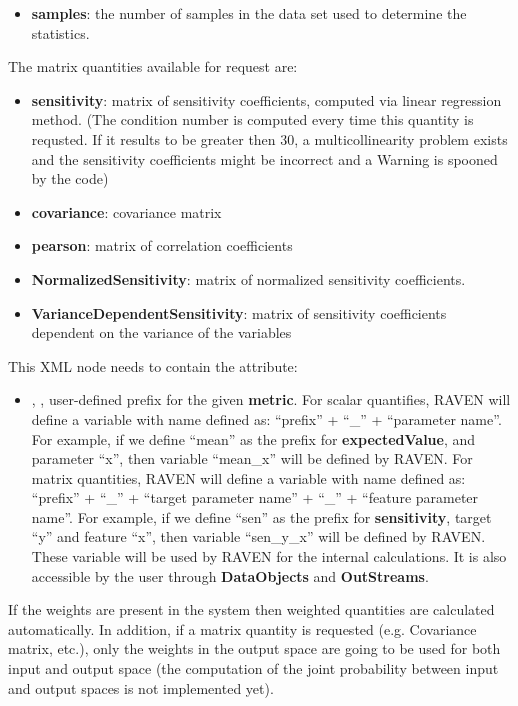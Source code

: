 \begin{itemize}
\begin{itemize}
    \item \textbf{samples}: the number of samples in the data set used to determine the statistics.
  \end{itemize}
  The matrix quantities available for request are:
  \begin{itemize}
    \item \textbf{sensitivity}: matrix of sensitivity coefficients, computed via linear regression method. (\nb The condition number is computed every time this quantity is requsted. If it results
    to be greater then $30$, a multicollinearity problem exists and the sensitivity coefficients
    might be incorrect and a Warning is spooned by the code)
    \item \textbf{covariance}: covariance matrix
    \item \textbf{pearson}: matrix of correlation coefficients
    \item \textbf{NormalizedSensitivity}: matrix of normalized sensitivity
    coefficients. 
    \item \textbf{VarianceDependentSensitivity}: matrix of sensitivity coefficients dependent on the variance of the variables
  \end{itemize}
  This XML node needs to contain the attribute:
  \begin{itemize}
    \itemsep0em
    \item {}, , user-defined prefix for the given \textbf{metric}.
      For scalar quantifies, RAVEN will define a variable with name defined as:  ``prefix'' + ``\_'' + ``parameter name''.
      For example, if we define ``mean'' as the prefix for \textbf{expectedValue}, and parameter ``x'', then variable
      ``mean\_x'' will be defined by RAVEN.
      For matrix quantities, RAVEN will define a variable with name defined as: ``prefix'' + ``\_'' + ``target parameter name'' + ``\_'' + ``feature parameter name''.
      For example, if we define ``sen'' as the prefix for \textbf{sensitivity}, target ``y'' and feature ``x'', then
      variable ``sen\_y\_x'' will be defined by RAVEN.
      \nb These variable will be used by RAVEN for the internal calculations. It is also accessible by the user through
      \textbf{DataObjects} and \textbf{OutStreams}.
  \end{itemize}
  \nb If the weights are present in the system then weighted quantities are calculated automatically. In addition, if a matrix quantity is requested (e.g. Covariance matrix, etc.), only the weights in the output space are going to be used for both input and output space (the computation of the joint probability between input and output spaces is not implemented yet).

\end{itemize}
